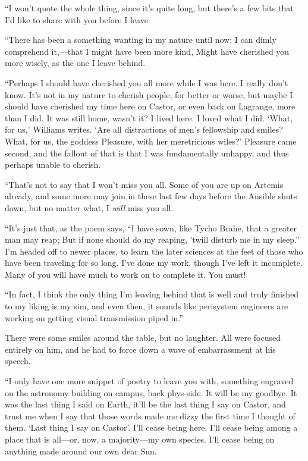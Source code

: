 ``I won't quote the whole thing, since it's quite long, but there's a few bits that I'd like to share with you before I leave.

``There has been a something wanting in my nature until now; I can dimly comprehend it,—that I might have been more kind, Might have cherished you more wisely, as the one I leave behind.

``Perhaps I should have cherished you all more while I was here. I really don't know. It's not in my nature to cherish people, for better or worse, but maybe I should have cherished my time here on Castor, or even back on Lagrange, more than I did. It was still home, wasn't it? I lived here. I loved what I did. `What, for us,' Williams writes. `Are all distractions of men's fellowship and smiles? What, for us, the goddess Pleasure, with her meretricious wiles?' Pleasure came second, and the fallout of that is that I was fundamentally unhappy, and thus perhaps unable to cherish.

``That's not to say that I won't miss you all. Some of you are up on Artemis already, and some more may join in these last few days before the Ansible shuts down, but no matter what, I \emph{will} miss you all.

``It's just that, as the poem says, ``I have sown, like Tycho Brahe, that a greater man may reap; But if none should do my reaping, 'twill disturb me in my sleep.'' I'm headed off to newer places, to learn the later sciences at the feet of those who have been traveling for so long. I've done my work, though I've left it incomplete. Many of you will have much to work on to complete it. You must!

``In fact, I think the only thing I'm leaving behind that is well and truly finished to my liking is my sim, and even then, it sounds like perisystem engineers are working on getting visual transmission piped in.''

There were some smiles around the table, but no laughter. All were focused entirely on him, and he had to force down a wave of embarrassment at his speech.

``I only have one more snippet of poetry to leave you with, something engraved on the astronomy building on campus, back phys-side. It will be my goodbye. It was the last thing I said on Earth, it'll be the last thing I say on Castor, and trust me when I say that those words made me dizzy the first time I thought of them. `Last thing I say on Castor'. I'll cease being here. I'll cease being among a place that is all—or, now, a majority—my own species. I'll cease being on anything made around our own dear Sun.

